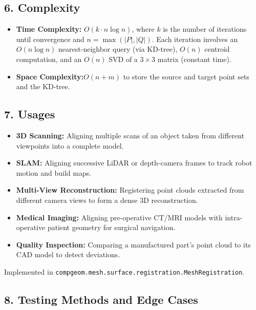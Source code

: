 \subsection{6. Complexity}

\begin{itemize}
    \item \textbf{Time Complexity:} $O(k \cdot n \log n)$, where $k$ is the number of iterations until convergence and $n = \max(|P|, |Q|)$. Each iteration involves an $O(n \log n)$ nearest-neighbor query (via KD-tree), $O(n)$ centroid computation, and an $O(n)$ SVD of a $3 \times 3$ matrix (constant time).
    \item \textbf{Space Complexity:}$ O(n + m)$ to store the source and target point sets and the KD-tree.
\end{itemize}

\subsection{7. Usages}

\begin{itemize}
    \item \textbf{3D Scanning:} Aligning multiple scans of an object taken from different viewpoints into a complete model.
    \item \textbf{SLAM:} Aligning successive LiDAR or depth-camera frames to track robot motion and build maps.
    \item \textbf{Multi-View Reconstruction:} Registering point clouds extracted from different camera views to form a dense 3D reconstruction.
    \item \textbf{Medical Imaging:} Aligning pre-operative CT/MRI models with intra-operative patient geometry for surgical navigation.
    \item \textbf{Quality Inspection:} Comparing a manufactured part's point cloud to its CAD model to detect deviations.
\end{itemize}

Implemented in \texttt{compgeom.mesh.surface.registration.MeshRegistration}.

\subsection{8. Testing Methods and Edge Cases}

